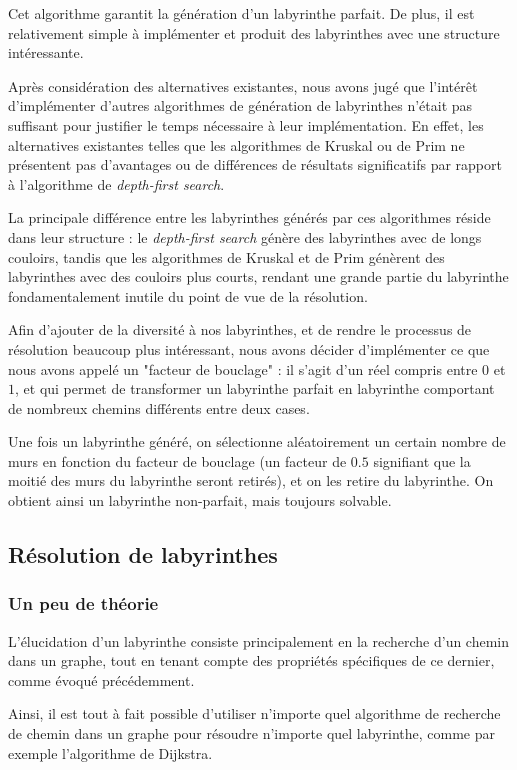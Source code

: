 \documentclass[12pt]{scrreprt} %
\begin{document}
Cet algorithme garantit la génération d'un labyrinthe parfait. De plus, il est relativement simple à implémenter et produit des labyrinthes avec une structure intéressante.

Après considération des alternatives existantes, nous avons jugé que l'intérêt d'implémenter d'autres algorithmes de génération de labyrinthes n'était pas suffisant pour justifier le temps nécessaire à leur implémentation. En effet, les alternatives existantes telles que les algorithmes de Kruskal ou de Prim ne présentent pas d'avantages ou de différences de résultats significatifs par rapport à l'algorithme de \textit{depth-first search}.

La principale différence entre les labyrinthes générés par ces algorithmes réside dans leur structure : le \textit{depth-first search} génère des labyrinthes avec de longs couloirs, tandis que les algorithmes de Kruskal et de Prim génèrent des labyrinthes avec des couloirs plus courts, rendant une grande partie du labyrinthe fondamentalement inutile du point de vue de la résolution.

Afin d'ajouter de la diversité à nos labyrinthes, et de rendre le processus de résolution beaucoup plus intéressant, nous avons décider d'implémenter ce que nous avons appelé un "facteur de bouclage" : il s'agit d'un réel compris entre $0$ et $1$, et qui permet de transformer un labyrinthe parfait en labyrinthe comportant de nombreux chemins différents entre deux cases.

Une fois un labyrinthe généré, on sélectionne aléatoirement un certain nombre de murs en fonction du facteur de bouclage (un facteur de $0.5$ signifiant que la moitié des murs du labyrinthe seront retirés), et on les retire du labyrinthe. On obtient ainsi un labyrinthe non-parfait, mais toujours solvable.

\subsection{Résolution de labyrinthes}

\subsubsection{Un peu de théorie}

L'élucidation d'un labyrinthe consiste principalement en la recherche d'un chemin dans un graphe, tout en tenant compte des propriétés spécifiques de ce dernier, comme évoqué précédemment.

Ainsi, il est tout à fait possible d'utiliser n'importe quel algorithme de recherche de chemin dans un graphe pour résoudre n'importe quel labyrinthe, comme par exemple l'algorithme de Dijkstra.
\end{document}
